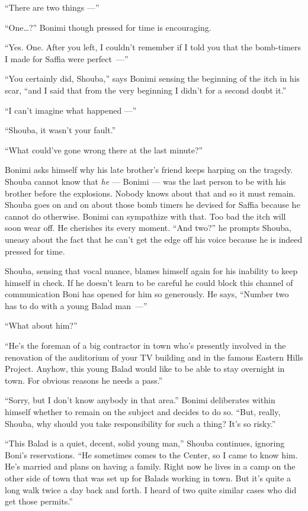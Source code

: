 \documentclass[twoside,11pt,openany]{book}
\begin{document}
``There are two things ---''

``One{\ldots}?'' Bonimi though pressed for time is encouraging.

``Yes. One. After you left, I couldn't remember if I told you that the bomb-timers I made for Saffia were
perfect~---''

``You certainly did, Shouba,'' says Bonimi sensing the beginning of the itch in his scar,
``and I said that from the very beginning I didn't for a second doubt it.''

``I can't imagine what happened ---''

``Shouba, it wasn't your fault.''

``What could've gone wrong there at the last minute?''

Bonimi asks himself why his late brother's friend keeps harping on the tragedy. Shouba cannot know that \textit{he} ---
Bonimi --- was the last person to be with his brother before the explosions. Nobody knows about that and so it must
remain. Shouba goes on and on about those bomb timers he devised for Saffia because he cannot do otherwise. Bonimi
can sympathize with that. Too bad the itch will soon wear off. He cherishes its every moment. ``And
two?'' he prompts Shouba, uneasy about the fact that he can't get the edge off  his voice because he is
indeed pressed for time.

Shouba, sensing that vocal nuance, blames himself again for his inability to keep himself in check. If he doesn't learn
to be careful he could block this channel of communication Boni has opened for him so generously. He says,
``Number two has to do with a young Balad man~---''

``What about him?''

``He's the foreman of a big contractor in town who's presently involved in the renovation of the auditorium
of your TV building and in the famous Eastern Hills Project. Anyhow, this young Balad would like to be able to stay
overnight in town. For obvious reasons he needs a pass.''

``Sorry, but I don't know anybody in that area.'' Bonimi deliberates within himself whether to
remain on the subject and decides to do so. ``But, really, Shouba, why should you take responsibility for
such a thing? It's so risky.''

``This Balad is a quiet, decent, solid young man,'' Shouba continues, ignoring Boni's
reservations. ``He sometimes comes to the Center, so I came to know him. He's married and plans on having a
family. Right now he lives in a camp on the other side of town that was set up for Balads working in town. But it's
quite a long walk twice a day back and forth. I heard of two quite similar cases who did get those
permits.''
\end{document}
